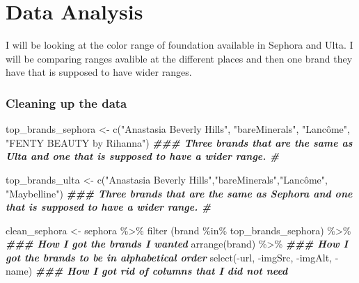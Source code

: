 \documentclass[
]{article}
\newenvironment{Shaded}{\begin{snugshade}}{\end{snugshade}}
\newcommand{\DocumentationTok}[1]{\textcolor[rgb]{0.56,0.35,0.01}{\textbf{\textit{#1}}}}
\newcommand{\FunctionTok}[1]{\textcolor[rgb]{0.00,0.00,0.00}{#1}}
\newcommand{\NormalTok}[1]{#1}
\newcommand{\OtherTok}[1]{\textcolor[rgb]{0.56,0.35,0.01}{#1}}
\newcommand{\SpecialCharTok}[1]{\textcolor[rgb]{0.00,0.00,0.00}{#1}}
\newcommand{\StringTok}[1]{\textcolor[rgb]{0.31,0.60,0.02}{#1}}
\begin{document}
\hypertarget{data-analysis}{%
\section{Data Analysis}\label{data-analysis}}

I will be looking at the color range of foundation available in Sephora
and Ulta. I will be comparing ranges avalible at the different places
and then one brand they have that is supposed to have wider ranges.

\hypertarget{cleaning-up-the-data}{%
\subsubsection{Cleaning up the data}\label{cleaning-up-the-data}}

\begin{Shaded}
\begin{Highlighting}[]
\NormalTok{top\_brands\_sephora }\OtherTok{\textless{}{-}} \FunctionTok{c}\NormalTok{(}\StringTok{"Anastasia Beverly Hills"}\NormalTok{, }\StringTok{"bareMinerals"}\NormalTok{, }\StringTok{"Lancôme"}\NormalTok{, }\StringTok{"FENTY BEAUTY by Rihanna"}\NormalTok{)  }\DocumentationTok{\#\#\# Three brands that are the same as Ulta and one that is supposed to have a wider range. \#}

\NormalTok{top\_brands\_ulta }\OtherTok{\textless{}{-}} \FunctionTok{c}\NormalTok{(}\StringTok{"Anastasia Beverly Hills"}\NormalTok{,}\StringTok{"bareMinerals"}\NormalTok{,}\StringTok{"Lancôme"}\NormalTok{, }\StringTok{"Maybelline"}\NormalTok{)                    }\DocumentationTok{\#\#\# Three brands that are the same as Sephora and one that is supposed to have a wider range. \#}

\NormalTok{clean\_sephora }\OtherTok{\textless{}{-}}\NormalTok{ sephora }\SpecialCharTok{\%\textgreater{}\%}
  \FunctionTok{filter}\NormalTok{ (brand }\SpecialCharTok{\%in\%}\NormalTok{ top\_brands\_sephora) }\SpecialCharTok{\%\textgreater{}\%}            \DocumentationTok{\#\#\# How I got the brands I wanted}
  \FunctionTok{arrange}\NormalTok{(brand) }\SpecialCharTok{\%\textgreater{}\%}                                    \DocumentationTok{\#\#\# How I got the brands to be in alphabetical order}
  \FunctionTok{select}\NormalTok{(}\SpecialCharTok{{-}}\NormalTok{url, }\SpecialCharTok{{-}}\NormalTok{imgSrc, }\SpecialCharTok{{-}}\NormalTok{imgAlt, }\SpecialCharTok{{-}}\NormalTok{name)                 }\DocumentationTok{\#\#\# How I got rid of columns that I did not need}


\end{Highlighting}
\end{Shaded}
\end{document}
